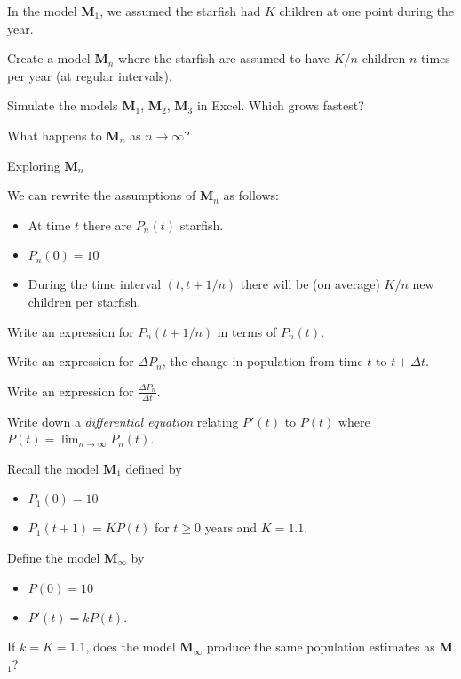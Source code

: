 \documentclass{workbook}
\begin{document}
\begin{slide}
	\question
	In the model \textbf{M$_1$}, we assumed the starfish had $K$ children at one point during the year.

	\begin{parts}
		\item Create a model \textbf{M$_n$} where the starfish are assumed to have $K/n$ children $n$ times per year (at regular intervals).
		\item Simulate the models \textbf{M$_1$}, \textbf{M$_2$}, \textbf{M$_3$} in Excel. Which grows fastest?
		\item What happens to \textbf{M$_n$} as $n\to\infty$?
	\end{parts}

\end{slide}

\begin{slide}
	\question
	Exploring \textbf{M$_n$}

	We can rewrite the assumptions of \textbf{M$_n$} as follows:
	\begin{itemize}
		\item At time $t$ there are $P_n(t)$ starfish.
		\item $P_n(0)=10$
		\item During the time interval $(t, t+1/n)$ there will be (on average) $K/n$ new children per starfish.
	\end{itemize}

	\begin{parts}
		\item Write an expression for $P_n(t+1/n)$ in terms of $P_n(t)$.
		\item Write an expression for $\Delta P_n$, the change in population from time $t$ to $t+\Delta t$.
		\item Write an expression for $\frac{\Delta P_n}{\Delta t}$.
		\item Write down a \emph{differential equation} relating $P'(t)$ to $P(t)$ where $\displaystyle P(t)=\lim_{n\to\infty} P_n(t)$.
	\end{parts}
\end{slide}

\begin{slide}
	\question
	Recall the model \textbf{M$_1$} defined by
	\begin{itemize}
		\item $P_1(0)=10$
		\item $P_1(t+1) = KP(t)$ for $t\geq 0$ years and $K=1.1$.
	\end{itemize}
	Define the model \textbf{M$_\infty$} by
	\begin{itemize}
		\item $P(0)=10$
		\item $P'(t) = kP(t)$.
	\end{itemize}


	\begin{parts}
		\item If $k=K=1.1$, does the model \textbf{M$_\infty$} produce the same population estimates as \textbf{M$_1$}?
	\end{parts}

	\vspace*{1in}
\end{slide}
\end{document}
